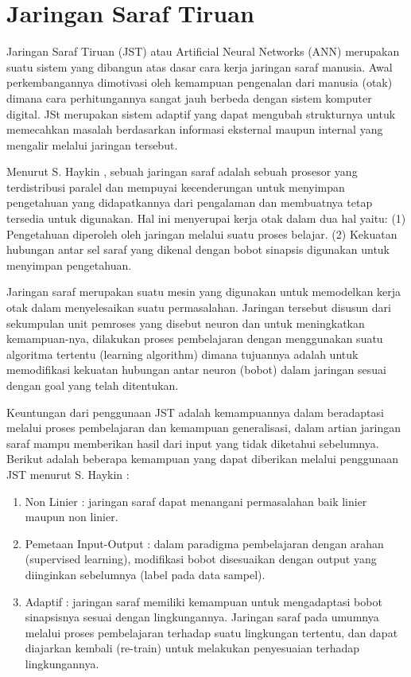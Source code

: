 \section{Jaringan Saraf Tiruan}
\label{sec:jst}

Jaringan Saraf Tiruan (JST) atau Artificial Neural Networks (ANN)
merupakan suatu sistem yang dibangun atas dasar cara kerja jaringan saraf
manusia. Awal perkembangannya dimotivasi oleh kemampuan pengenalan dari manusia
(otak) dimana cara perhitungannya sangat jauh berbeda dengan sistem komputer
digital. JSt merupakan sistem adaptif yang dapat mengubah strukturnya
untuk memecahkan masalah berdasarkan informasi eksternal maupun internal
yang mengalir melalui jaringan tersebut. 

Menurut S. Haykin \cite{Haykin:1994}, sebuah jaringan saraf adalah sebuah
prosesor yang terdistribusi paralel dan mempuyai kecenderungan untuk menyimpan
pengetahuan yang didapatkannya dari pengalaman dan membuatnya tetap tersedia
untuk digunakan. Hal ini menyerupai kerja otak dalam dua hal yaitu: (1)
Pengetahuan diperoleh oleh jaringan melalui suatu proses belajar. (2) Kekuatan
hubungan antar sel saraf yang dikenal dengan bobot sinapsis digunakan untuk
menyimpan pengetahuan.

Jaringan saraf merupakan suatu mesin yang digunakan untuk memodelkan kerja otak
dalam menyelesaikan suatu permasalahan. Jaringan tersebut disusun dari
sekumpulan unit pemroses yang disebut neuron dan untuk meningkatkan
kemampuan-nya, dilakukan proses pembelajaran dengan menggunakan suatu algoritma
tertentu (learning algorithm) dimana tujuannya adalah untuk memodifikasi
kekuatan hubungan antar neuron (bobot) dalam jaringan sesuai dengan goal yang
telah ditentukan.

Keuntungan dari penggunaan JST adalah kemampuannya dalam beradaptasi melalui
proses pembelajaran dan kemampuan generalisasi, dalam artian jaringan saraf
mampu memberikan hasil dari input yang tidak diketahui sebelumnya. Berikut
adalah beberapa kemampuan yang dapat diberikan melalui penggunaan JST menurut S.
Haykin \cite{Haykin:1994}:
\begin{enumerate}
  \item Non Linier : jaringan saraf dapat menangani permasalahan baik linier
  maupun non linier.
  \item Pemetaan Input-Output : dalam paradigma pembelajaran dengan arahan
  (supervised learning), modifikasi bobot disesuaikan dengan output yang
  diinginkan sebelumnya (label pada data sampel).
  \item Adaptif : jaringan saraf memiliki kemampuan untuk mengadaptasi bobot
  sinapsisnya sesuai dengan lingkungannya. Jaringan saraf pada umumnya melalui
  proses pembelajaran terhadap suatu lingkungan tertentu, dan dapat diajarkan
  kembali (re-train) untuk melakukan penyesuaian terhadap lingkungannya. 
\end{enumerate}

